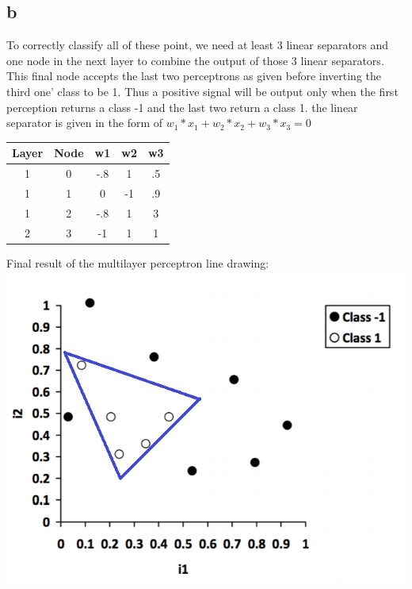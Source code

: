 \documentclass[11pt, oneside]{article}   	%
\begin{document}
\begin{flushleft}
\subsection*{b}
To correctly classify all of these point, we need at least 3 linear separators and one node in the next layer to combine the output of those 3 linear separators. This final node accepts the last two perceptrons as given before inverting the third one' class to be 1. Thus a positive signal will be output only when the first perception returns a class -1 and the last two return a class 1.
the linear separator is given in the form of $w_{1}*x_{1}+w_{2}*x_{2}+w_{3}*x_{3}=0$
\begin{center}
\begin{tabular}{|c|c|c|c|c|}
\hline
Layer & Node & w1 &	w2 & w3 \\ \hline
1 & 0 & -.8 & 1 & .5 \\ \hline
1 & 1 & 0 & -1 & .9 \\ \hline
1 & 2 &	-.8 & 1 & 3 \\ \hline
2 & 3 &	-1 & 1 & 1 \\ \hline
\end{tabular}
\end{center}
Final result of the multilayer perceptron line drawing: \\
\includegraphics[]{q5_mlp.png}

\end{flushleft}
\end{document}
